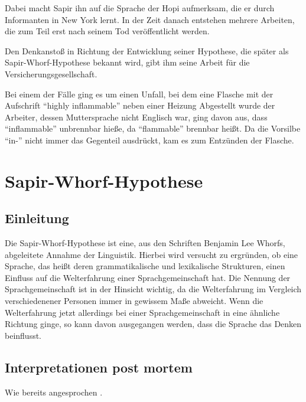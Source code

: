 \documentclass[12pt]{scrreprt}
\begin{document}
		Dabei macht Sapir ihn auf die Sprache der Hopi aufmerksam, die er durch
		Informanten in New York lernt. In der Zeit danach entstehen mehrere Arbeiten,
		die zum Teil erst nach seinem Tod veröffentlicht werden.

		Den Denkanstoß in Richtung der Entwicklung seiner Hypothese, die später als
		Sapir-Whorf-Hypothese bekannt wird, gibt ihm seine Arbeit für die
		Versicherungsgesellschaft.

		Bei einem der Fälle ging es um einen Unfall, bei dem eine Flasche mit der
		Aufschrift \enquote{highly inflammable} neben einer Heizung Abgestellt wurde
		der Arbeiter, dessen Muttersprache nicht Englisch war, ging davon aus, dass
		\enquote{inflammable} unbrennbar hieße, da \enquote{flammable} brennbar
		heißt. Da die Vorsilbe \enquote{in-} nicht immer das Gegenteil ausdrückt,
		kam es zum Entzünden der Flasche.\autocite{wiki:Benjamin_Lee_Whorf}

\chapter{Sapir-Whorf-Hypothese}
\label{chap:s_p_hypothese}
\section{Einleitung}
\label{sec:s_p_einleitung}
Die Sapir-Whorf-Hypothese ist eine, aus den Schriften Benjamin Lee Whorfs,
abgeleitete Annahme der Linguistik. Hierbei wird versucht zu ergründen, ob eine
Sprache, das heißt deren grammatikalische und lexikalische Strukturen, einen
Einfluss auf die Welterfahrung einer Sprachgemeinschaft hat. Die Nennung der
Sprachgemeinschaft ist in der Hinsicht wichtig, da die Welterfahrung im
Vergleich verschiedenener Personen immer in gewissem Maße abweicht. Wenn die
Welterfahrung jetzt allerdings bei einer Sprachgemeinschaft in eine ähnliche
Richtung ginge, so kann davon ausgegangen werden, dass die Sprache das Denken
beinflusst.\autocite{wiki:Sapir-Whorf-Hypothese}
	\section{Interpretationen post mortem}
	\label{sec:s_p_interpret}
	Wie bereits angesprochen .
\end{document}
